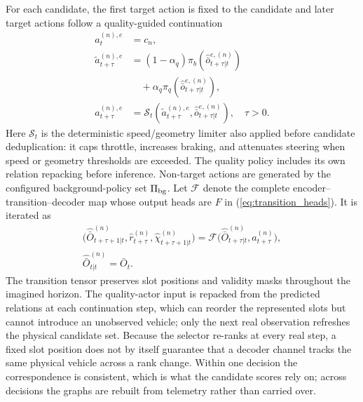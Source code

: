 \documentclass[journal]{IEEEtran}
\begin{document}
For each candidate, the first target action is fixed to the candidate and
later target actions follow a quality-guided continuation
\begin{equation}
\begin{aligned}
 a_t^{(n),e}&=c_n,\\
 \tilde a_{t+\tau}^{(n),e}&=(1-\alpha_q)\pi_b(\hat{\bar o}_{t+\tau|t}^{e,(n)})\\
 &\quad+\alpha_q\pi_q(\hat{\bar o}_{t+\tau|t}^{e,(n)}),\\
 a_{t+\tau}^{(n),e}&=\mathcal S_t(\tilde a_{t+\tau}^{(n),e},
 \hat{\bar o}_{t+\tau|t}^{e,(n)}),\quad\tau>0.
\end{aligned}
\label{eq:actor_continuation}
\end{equation}
Here $\mathcal S_t$ is the deterministic speed/geometry limiter also applied
before candidate deduplication: it caps throttle, increases braking, and
attenuates steering when speed or geometry thresholds are exceeded.
The quality policy includes its own relation repacking before inference.
Non-target actions are generated by the configured background-policy set
$\Pi_{\rm bg}$. Let $\mathcal F$ denote the complete encoder--transition--decoder
map whose output heads are $F$ in (\ref{eq:transition_heads}). It is iterated as
\begin{equation}
\begin{gathered}
 \bigl(\hat{\bar O}_{t+\tau+1|t}^{(n)},\hat r_{t+\tau}^{(n)},\hat\chi_{t+\tau+1|t}^{(n)}\bigr)
 =\mathcal F\bigl(\hat{\bar O}_{t+\tau|t}^{(n)},a_{t+\tau}^{(n)}\bigr),\\
 \hat{\bar O}_{t|t}^{(n)}=\bar O_t.
\end{gathered}
\label{eq:rollout_recurrence}
\end{equation}
The transition tensor preserves slot positions and validity masks throughout
the imagined horizon. The quality-actor input is repacked from the predicted
relations at each continuation step, which can reorder the represented slots
but cannot introduce an unobserved vehicle; only the next real observation
refreshes the physical candidate set. Because the selector re-ranks at every
real step, a fixed slot position does not by itself guarantee that a decoder
channel tracks the same physical vehicle across a rank change. Within one
decision the correspondence is consistent, which is what the candidate scores
rely on; across decisions the graphs are rebuilt from telemetry rather than
carried over.
\end{document}
